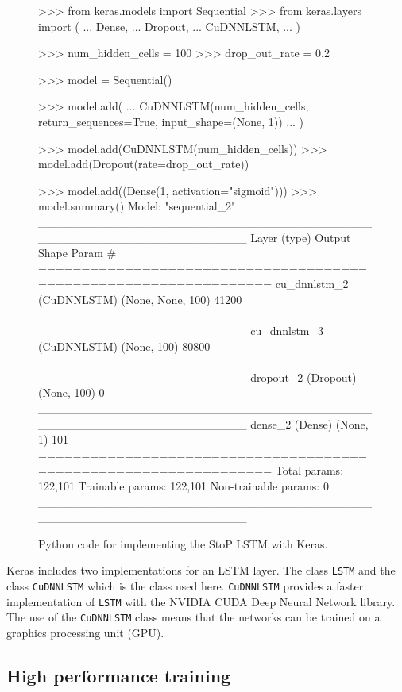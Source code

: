 \begin{figure}[!htbp]
\begin{usagepy}
>>> from keras.models import Sequential
>>> from keras.layers import (
...     Dense,
...     Dropout,
...     CuDNNLSTM,
... )

>>> num_hidden_cells = 100
>>> drop_out_rate = 0.2

>>> model = Sequential()

>>> model.add(
...     CuDNNLSTM(num_hidden_cells, return_sequences=True, input_shape=(None, 1))
... )

>>> model.add(CuDNNLSTM(num_hidden_cells))
>>> model.add(Dropout(rate=drop_out_rate))

>>> model.add((Dense(1, activation="sigmoid")))
>>> model.summary()
Model: "sequential_2"
_________________________________________________________________
Layer (type)                 Output Shape              Param #   
=================================================================
cu_dnnlstm_2 (CuDNNLSTM)     (None, None, 100)         41200     
_________________________________________________________________
cu_dnnlstm_3 (CuDNNLSTM)     (None, 100)               80800     
_________________________________________________________________
dropout_2 (Dropout)          (None, 100)               0         
_________________________________________________________________
dense_2 (Dense)              (None, 1)                 101       
=================================================================
Total params: 122,101
Trainable params: 122,101
Non-trainable params: 0
_________________________________________________________________

\end{usagepy}
\caption{Python code for implementing the StoP LSTM with Keras.}\label{fig:keras_sequence_to_probability}
\end{figure}

Keras includes two implementations for an LSTM layer. The class
\texttt{LSTM} and the class \texttt{CuDNNLSTM} which is
the class used here. \texttt{CuDNNLSTM} provides a faster
implementation of \texttt{LSTM} with the NVIDIA CUDA Deep Neural Network
library. The use of the \texttt{CuDNNLSTM} class means that the networks
can be trained on a graphics processing unit (GPU).

\subsection{High performance training}

